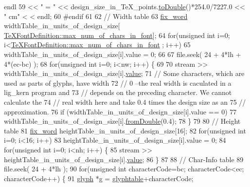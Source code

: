 \begin{DoxyCode}
      endl
59                 << \textcolor{stringliteral}{"            = "} << design\_size\_in\_TeX\_points.\hyperlink{classfix__word_a6d960fb9bf343763b687a04cc3af1215}{toDouble}()*254.0/7227.0 << \textcolor{stringliteral}{" cm"} <
      < endl;
60 \textcolor{preprocessor}{#endif}
61 
62   \textcolor{comment}{// Width table}
63   \hyperlink{classfix__word}{fix\_word} widthTable\_in\_units\_of\_design\_size[
      \hyperlink{classTeXFontDefinition_a542c448736e5c591257ac3889f047d66}{TeXFontDefinition::max\_num\_of\_chars\_in\_font}];
64   \textcolor{keywordflow}{for}(\textcolor{keywordtype}{unsigned} \textcolor{keywordtype}{int} i=0; i<\hyperlink{classTeXFontDefinition_a542c448736e5c591257ac3889f047d66}{TeXFontDefinition::max\_num\_of\_chars\_in\_font}
      ; i++)
65     widthTable\_in\_units\_of\_design\_size[i].value = 0;
66 
67   file.seek( 24 + 4*lh + 4*(ec-bc) );
68   \textcolor{keywordflow}{for}(\textcolor{keywordtype}{unsigned} \textcolor{keywordtype}{int} i=0; i<nw; i++) \{
69 
70     stream >> widthTable\_in\_units\_of\_design\_size[i].\hyperlink{classfix__word_af0db00b285e54bf5c2da670519149dc0}{value};
71     \textcolor{comment}{// Some characters, which are used as parts of glyphs, have width}
72     \textcolor{comment}{// 0 --the real width is caculated in a lig\_kern program and}
73     \textcolor{comment}{// depends on the preceding character. We cannot calculate the}
74     \textcolor{comment}{// real width here and take 0.4 times the design size as an}
75     \textcolor{comment}{// approximation.}
76     \textcolor{keywordflow}{if} (widthTable\_in\_units\_of\_design\_size[i].value == 0)
77       widthTable\_in\_units\_of\_design\_size[i].\hyperlink{classfix__word_a7bba9d6cd8527149cbac372929b5d443}{fromDouble}(0.4);
78   \}
79 
80   \textcolor{comment}{// Height table}
81   \hyperlink{classfix__word}{fix\_word} heightTable\_in\_units\_of\_design\_size[16];
82   \textcolor{keywordflow}{for}(\textcolor{keywordtype}{unsigned} \textcolor{keywordtype}{int} i=0; i<16; i++)
83     heightTable\_in\_units\_of\_design\_size[i].value = 0;
84   \textcolor{keywordflow}{for}(\textcolor{keywordtype}{unsigned} \textcolor{keywordtype}{int} i=0; i<nh; i++) \{
85     stream >> heightTable\_in\_units\_of\_design\_size[i].\hyperlink{classfix__word_af0db00b285e54bf5c2da670519149dc0}{value};
86   \}
87 
88   \textcolor{comment}{// Char-Info table}
89   file.seek( 24 + 4*lh );
90   \textcolor{keywordflow}{for}(\textcolor{keywordtype}{unsigned} \textcolor{keywordtype}{int} characterCode=bc; characterCode<ec; characterCode++) \{
91     \hyperlink{classglyph}{glyph} *g = \hyperlink{classTeXFont_a4ec465c9b189f0845a25ad5c99903e5f}{glyphtable}+characterCode;

\end{DoxyCode}
